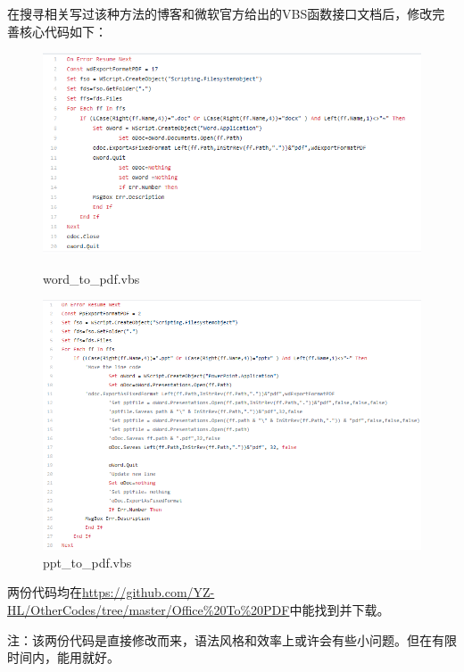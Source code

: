 \documentclass[a5paper]{article}
\begin{document}
        在搜寻相关写过该种方法的博客和微软官方给出的VBS函数接口文档后，修改完善核心代码如下：

        \begin{figure}[htbp]
        \centering
        \begin{minipage}[t]{0.49\textwidth}
        \centering
        \includegraphics[scale=0.2]{2.2-p2.png}
        \caption*{word\_to\_pdf.vbs}
        \end{minipage}
        \begin{minipage}[t]{0.49\textwidth}
        \centering
        \includegraphics[scale=0.2]{2.2-p3.png}
        \caption*{ppt\_to\_pdf.vbs}
        \end{minipage}
        \end{figure}

        两份代码均在\url{https://github.com/YZ-HL/OtherCodes/tree/master/Office%20To%20PDF}中能找到并下载。

        注：该两份代码是直接修改而来，语法风格和效率上或许会有些小问题。但在有限时间内，能用就好。
\end{document}
